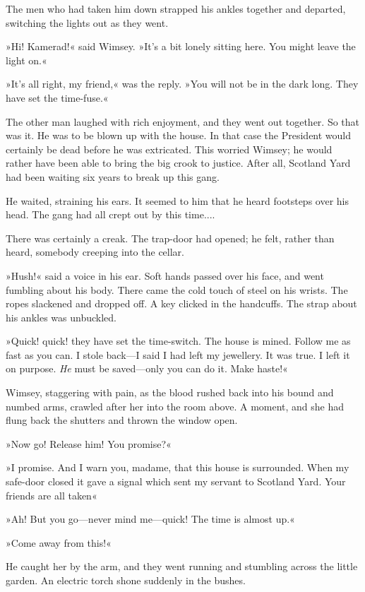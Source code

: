 The men who had taken him down strapped his ankles together and departed, switching the lights out as they went.

»Hi! Kamerad!« said Wimsey. »It's a bit lonely sitting here. You might leave the light on.«

»It's all right, my friend,« was the reply. »You will not be in the dark long. They have set the time-fuse.«

The other man laughed with rich enjoyment, and they went out together. So that was it. He was to be blown up with the house. In that case the President would certainly be dead before he was extricated. This worried Wimsey; he would rather have been able to bring the big crook to justice. After all, Scotland Yard had been waiting six years to break up this gang.

He waited, straining his ears. It seemed to him that he heard footsteps over his head. The gang had all crept out by this time....

There was certainly a creak. The trap-door had opened; he felt, rather than heard, somebody creeping into the cellar.

»Hush!« said a voice in his ear. Soft hands passed over his face, and went fumbling about his body. There came the cold touch of steel on his wrists. The ropes slackened and dropped off. A key clicked in the handcuffs. The strap about his ankles was unbuckled.

»Quick! quick! they have set the time-switch. The house is mined. Follow me as fast as you can. I stole back—I said I had left my jewellery. It was true. I left it on purpose. \textit{He} must be saved—only you can do it. Make haste!«

Wimsey, staggering with pain, as the blood rushed back into his bound and numbed arms, crawled after her into the room above. A moment, and she had flung back the shutters and thrown the window open.

»Now go! Release him! You promise?«

»I promise. And I warn you, madame, that this house is surrounded. When my safe-door closed it gave a signal which sent my servant to Scotland Yard. Your friends are all taken\longdash«

»Ah! But you go—never mind me—quick! The time is almost up.«

»Come away from this!«

He caught her by the arm, and they went running and stumbling across the little garden. An electric torch shone suddenly in the bushes.

